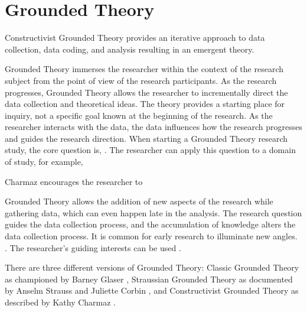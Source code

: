 
\chapter{Grounded Theory}

Constructivist Grounded Theory \cite{Charmaz} provides an iterative approach to data collection, data coding, and analysis resulting in an emergent theory. 

Grounded Theory immerses the researcher within the context of the research subject from the point of view of the research participants. As the research progresses, Grounded Theory allows the researcher to incrementally direct the data collection and theoretical ideas. The theory provides a starting place for inquiry, not a specific goal known at the beginning of the research. As the researcher interacts with the data, the data influences how the research progresses and guides the research direction. When starting a Grounded Theory research study, the core question is,  \cite{GlaserTheoreticalSensitivity}. The researcher can apply this question to a domain of study, for example, 

Charmaz encourages the researcher to 


Grounded Theory allows the addition of new aspects of the research while gathering data, which can even happen late in the analysis. The research question guides the data collection process, and the accumulation of knowledge alters the data collection process. It is common for early research to illuminate new angles.  \cite{Charmaz}. The researcher's guiding interests can be used  \cite{Charmaz}.

There are three different versions of Grounded Theory: Classic Grounded Theory as championed by Barney Glaser \cite{GlaserDiscovery}, Straussian Grounded Theory as documented by Anselm Strauss and Juliette Corbin \cite{Strauss1988Basics}, and Constructivist Grounded Theory as described by Kathy Charmaz \cite{Charmaz}. 

